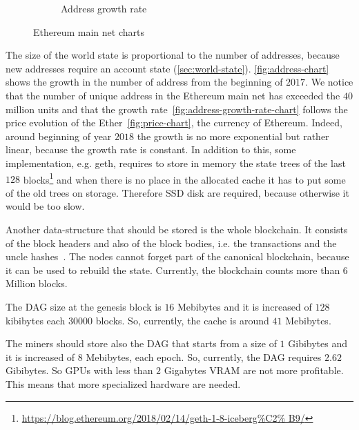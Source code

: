 \begin{figure}
\begin{subfigure}[b]{0.5\textwidth}
        \caption{Address growth rate}
        \label{fig:address-growth-rate-chart}
    \end{subfigure}
    \caption{Ethereum main net charts}
\end{figure}

The size of the world state is proportional to the number of addresses, because
new addresses require an account state (\autoref{sec:world-state}).
\autoref{fig:address-chart} shows the growth in the number of address from the
beginning of $2017$. We notice that the number of unique address in the
Ethereum main net has exceeded the $40$ million units and that the growth
rate~\autoref{fig:address-growth-rate-chart} follows the price evolution of the
Ether~\autoref{fig:price-chart}, the currency of Ethereum. Indeed, around
beginning of year $2018$ the growth is no more exponential but rather linear,
because the growth rate is constant.
In addition to this, some implementation, e.g. geth, requires to store in memory
the state trees of the last $128$ 
blocks\footnote{\url{https://blog.ethereum.org/2018/02/14/geth-1-8-iceberg\%C2\%
B9/}} and when there is no place in the allocated cache it has to put some of
the old trees on storage. Therefore SSD disk are required, because otherwise it
would be too slow.

Another data-structure that should be stored is the whole blockchain. It 
consists of the block headers and also of the block bodies, i.e. the 
transactions and the uncle hashes~\cite{wood2018ethereum}. The nodes cannot
forget part of the canonical blockchain, because it can be used to rebuild 
the state. Currently, the blockchain counts more than $6$ Million blocks.

The DAG size at the genesis block is $16$ Mebibytes and it is increased of $128$
kibibytes each $30000$ blocks. So, currently, the cache is around $41$ 
Mebibytes.

The miners should store also the DAG that starts from a size of $1$ Gibibytes
and it is increased of $8$ Mebibytes, each epoch. So, currently, the DAG 
requires $2.62$ Gibibytes. So GPUs with less than $2$ Gigabytes VRAM are not
more profitable. This means that more specialized hardware are needed.



